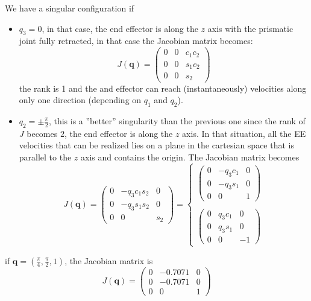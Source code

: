 \documentclass[10pt, letterpaper]{report}
\begin{document}
We have a singular configuration if\begin{itemize}
    \item $q_3=0$, in that case, the end effector is along the $z$ axis with the prismatic joint fully retracted, in that case the Jacobian matrix becomes:\begin{equation}
    J(\mathbf q) = \begin{pmatrix}
       0&0&c_1c_2\\ 
        0&0&s_1c_2\\ 
        0&0&s_2
    \end{pmatrix}
\end{equation}
the rank is 1 and the and effector can reach (instantaneously) velocities along only one direction (depending on $q_1$ and $q_2$). 
\item $q_2=\pm\frac{\pi}{2}$, this is a ''better'' singularity than the previous one since the rank of $J$ becomes $2$, the end effector is along the $z$ axis. In that situation, all the EE velocities that can be realized lies on a plane in the cartesian space that is parallel to the $z$ axis and contains the origin. The Jacobian matrix becomes \begin{equation}
    J(\mathbf q) = \begin{pmatrix}
        0&-q_3c_1s_2&0\\ 
        0&-q_3s_1s_2&0\\ 
        0&0&s_2
    \end{pmatrix}=\begin{cases}
        \begin{pmatrix}
        0&-q_3c_1&0\\ 
        0&-q_3s_1&0\\ 
        0&0&1
    \end{pmatrix}\\ \\
    \begin{pmatrix}
        0&q_3c_1&0\\ 
        0&q_3s_1&0\\ 
        0&0&-1
    \end{pmatrix}
    \end{cases}
\end{equation}
\end{itemize}
if $\mathbf q = (\frac{\pi}{4},\frac{\pi}{2},1)$, the Jacobian matrix is 
$$J(\mathbf q)=\begin{pmatrix}
        0&-0.7071&0\\ 
        0&-0.7071&0\\ 
        0&0&1
\end{pmatrix}$$
\end{document}
